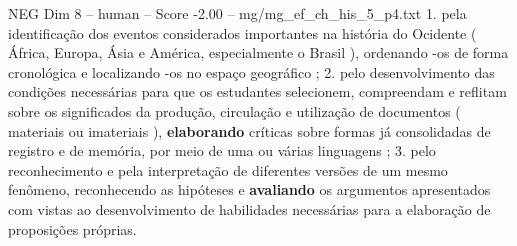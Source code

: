 \begin{textsample}{NEG Dim 8 – human – Score -2.00 – mg/mg\_ef\_ch\_his\_5\_p4.txt}  \label{ex:f8_neg_011}
1. pela identificação dos eventos considerados importantes na história do Ocidente ( África, Europa, Ásia e América, especialmente o Brasil ), ordenando -os de forma cronológica e localizando -os no espaço geográfico ; 2. pelo desenvolvimento das condições necessárias para que os estudantes selecionem, compreendam e reflitam sobre os significados da produção, circulação e utilização de documentos ( materiais ou imateriais ), \textbf{elaborando} críticas sobre formas já consolidadas de registro e de memória, por meio de uma ou várias linguagens ; 3. pelo reconhecimento e pela interpretação de diferentes versões de um mesmo fenômeno, reconhecendo as hipóteses e \textbf{avaliando} os argumentos apresentados com vistas ao desenvolvimento de habilidades necessárias para a elaboração de proposições próprias.

\end{textsample}
